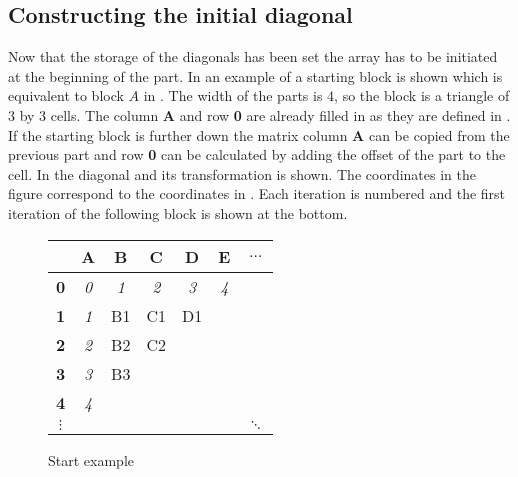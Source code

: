


\subsection{Constructing the initial diagonal} \label{section:initial}
Now that the storage of the diagonals has been set the array has to be initiated at the beginning of the part.
In  an example of a starting block is shown which is equivalent to block $A$ in .
The width of the parts is $4$, so the block is a triangle of $3$ by $3$ cells.
The column \textbf{A} and row \textbf{0} are already filled in as they are defined in .
If the starting block is further down the matrix column \textbf{A} can be copied from the previous part and row \textbf{0} can be calculated by adding the offset of the part to the cell.
In  the diagonal and its transformation is shown.
The coordinates in the figure correspond to the coordinates in .
Each iteration is numbered and the first iteration of the following block is shown at the bottom.

{\newcommand\C[0]{\cellcolor{gray}}
\begin{figure}
\centering \large
\begin{tabular}{|c|c||c|c|c|c||c} \hline
           & \textbf{A} & \textbf{B} & \textbf{C} & \textbf{D} & \textbf{E} & $\dotsc$ \\ \hline
\textbf{0} & \textit{0} & \textit{1} & \textit{2} & \textit{3} & \textit{4} &          \\ \hline \hline
\textbf{1} & \textit{1} & B1         & C1         & D1         & \C         &          \\ \hline
\textbf{2} & \textit{2} & B2         & C2         & \C         & \C         &          \\ \hline
\textbf{3} & \textit{3} & B3         & \C         & \C         & \C         &          \\ \hline
\textbf{4} & \textit{4} & \C         & \C         & \C         & \C         &          \\ \hline
$\vdots$   & \C         & \C         & \C         & \C         & \C         & $\ddots$ \\
\end{tabular}
\caption{Start example} \label{tstart}
\end{figure}
}

